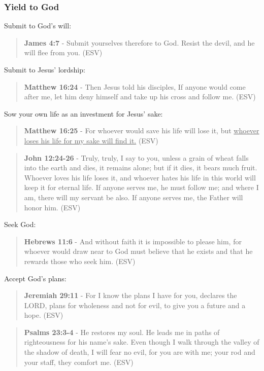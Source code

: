 \documentclass[11pt]{article}
\begin{document}
\subsubsection{Yield to God}
\label{sec:org79cfe5b}
Submit to God's will:

\begin{quote}
\textbf{James 4:7} - Submit yourselves therefore to God. Resist the devil, and he will flee from you. (ESV)
\end{quote}

Submit to Jesus' lordship:

\begin{quote}
\textbf{Matthew 16:24} - Then Jesus told his disciples, If anyone would come after me, let him deny himself and take up his cross and follow me. (ESV)
\end{quote}

Sow your own life as an investment for Jesus' sake:

\begin{quote}
\textbf{Matthew 16:25} - For whoever would save his life will lose it, but \uline{whoever loses his life for my sake will find it.} (ESV)
\end{quote}

\begin{quote}
\textbf{John 12:24-26} - Truly, truly, I say to you, unless a grain of wheat falls into the earth and dies, it remains alone; but if it dies, it bears much fruit. Whoever loves his life loses it, and whoever hates his life in this world will keep it for eternal life. If anyone serves me, he must follow me; and where I am, there will my servant be also. If anyone serves me, the Father will honor him. (ESV)
\end{quote}

Seek God:

\begin{quote}
\textbf{Hebrews 11:6} - And without faith it is impossible to please him, for whoever would draw near to God must believe that he exists and that he rewards those who seek him. (ESV)
\end{quote}

Accept God's plans:

\begin{quote}
\textbf{Jeremiah 29:11} - For I know the plans I have for you, declares the LORD, plans for wholeness and not for evil, to give you a future and a hope. (ESV)
\end{quote}

\begin{quote}
\textbf{Psalms 23:3-4} - He restores my soul. He leads me in paths of righteousness for his name's sake. Even though I walk through the valley of the shadow of death, I will fear no evil, for you are with me; your rod and your staff, they comfort me. (ESV)
\end{quote}
\end{document}
